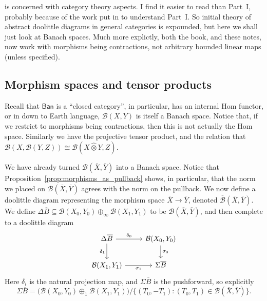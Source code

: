 \documentclass[a4paper,11pt]{article}
\theoremstyle{plain}
\theoremstyle{remark}
\newcommand{\mc}[1]{\mathcal{#1}}
\newcommand{\msf}[1]{\mathsf{#1}}
\newcommand{\proten}{\widehat\otimes}
\begin{document}
\cite[Part~II]{KP_InterpolationFunctorsDuality} is concerned with category theory aspects.  I find it easier to read than Part~I, probably because of the work put in to understand Part~I.  So initial theory of abstract doolittle diagrams in general categories is expounded, but here we shall just look at Banach spaces.  Much more explictly, both the book, and these notes, now work with morphisms being contractions, not arbitrary bounded linear maps (unless specified).

\subsection{Morphism spaces and tensor products}\label{sec:mor_tenprod}

Recall that $\msf{Ban}$ is a ``closed category'', in particular, has an internal Hom functor, or in down to Earth language, $\mc B(X,Y)$ is itself a Banach space.  Notice that, if we restrict to morphisms being contractions, then this is not actually the Hom space.  Similarly we have the projective tensor product, and the relation that $\mc B(X, \mc B(Y,Z)) \cong \mc B(X\proten Y, Z)$.

We have already turned $\mc B(\overline X,\overline Y)$ into a Banach space.  Notice that Proposition~\ref{prop:morphisms_as_pullback} shows, in particular, that the norm we placed on $\mc B(\overline X, \overline Y)$ agrees with the norm on the pullback.  We now define a doolittle diagram representing the morphism space $\overline X \to \overline Y$, denoted $\overline{\mc B}(\overline X,\overline Y)$.  We define $\Delta\overline B \subseteq \mc B(X_0,Y_0) \oplus_\infty \mc B(X_1, Y_1)$ to be $\mc B(\overline X, \overline Y)$, and then complete to a doolittle diagram
\[ \begin{tikzcd}
\Delta\overline B \arrow[r, "\delta_0"] \arrow[d, "\delta_1"'] & \mc B(X_0,Y_0) \arrow[d, "\sigma_0"] \\
\mc B(X_1,Y_1) \arrow[r, "\sigma_1"'] & \Sigma\overline B
\end{tikzcd} \]
Here $\delta_i$ is the natural projection map, and $\Sigma\overline B$ is the pushforward, so explicitly
\[ \Sigma\overline B = \big( \mc B(X_0,Y_0) \oplus_1 \mc B(X_1,Y_1) \big)
/ \{ (T_0, -T_1) :  (T_0, T_1) \in \mc B(\overline X, \overline Y) \}. \]
\end{document}
